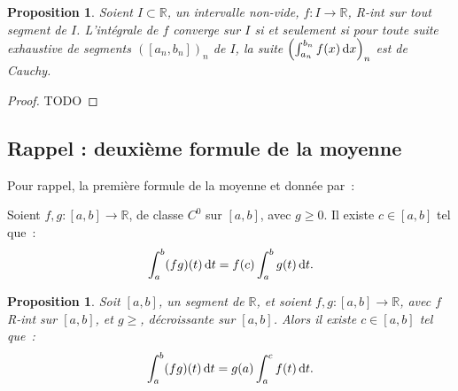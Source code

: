 \documentclass{report}
\newtheorem{prp}[thm]{Proposition}
\theoremstyle{definition}
\theoremstyle{remark}
\newcommand{\R}{\mathbb R}
\begin{document}
			\begin{prp} Soient $I \subset \R$, un intervalle non-vide, $f : I \to \R$, R-int sur tout segment de $I$. L'intégrale de $f$ converge sur $I$ si et seulement
			si pour toute suite exhaustive de segments $([a_n, b_n])_n$ de $I$, la suite $\left(\int_{a_n}^{b_n}f(x)\dif x\right)_n$ est de Cauchy.
			\end{prp}

			\begin{proof} TODO
			\end{proof}

		\subsection{Rappel : deuxième formule de la moyenne}
			Pour rappel, la première formule de la moyenne et donnée par~:

			Soient $f, g : [a, b] \to \R$, de classe $C^0$ sur $[a, b]$, avec $g \geq 0$. Il existe $c \in [a, b]$ tel que~:
			\[\int_a^b(fg)(t)\dif t = f(c)\int_a^bg(t)\dif t.\]

			\begin{prp} Soit $[a, b]$, un segment de $\R$, et soient $f, g : [a, b] \to \R$, avec $f$ R-int sur $[a, b]$, et $g \geq $, décroissante sur $[a, b]$.
			Alors il existe $c \in [a, b]$ tel que~:
			\[\int_a^b(fg)(t)\dif t = g(a)\int_a^cf(t)\dif t.\]
			\end{prp}
\end{document}
